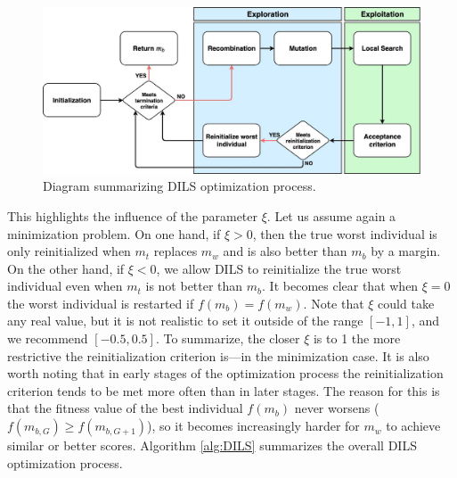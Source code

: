 \documentclass[review]{elsarticle}
\begin{document}
\begin{figure}[!h]
	\centering
	\includegraphics[scale=0.25]{Figures/DILSDiagram.jpg}
	\caption{Diagram summarizing DILS optimization process.}\label{img:DILS_diag}
\end{figure}

This highlights the influence of the parameter $\xi$. Let us assume again a minimization problem. On one hand, if $\xi > 0$, then the true worst individual is only reinitialized when $m_t$ replaces $m_w$ and is also better than $m_b$ by a margin. On the other hand, if $\xi < 0$, we allow DILS to reinitialize the true worst individual even when $m_t$ is not better than $m_b$. It becomes clear that when $\xi = 0$ the worst individual is restarted if $f(m_b) = f(m_w)$. Note that $\xi$ could take any real value, but it is not realistic to set it outside of the range $[-1,1]$, and we recommend $[-0.5, 0.5]$. To summarize, the closer $\xi$ is to 1 the more restrictive the reinitialization criterion is---in the minimization case. It is also worth noting that in early stages of the optimization process the reinitialization criterion tends to be met more often than in later stages. The reason for this is that the fitness value of the best individual $f(m_b)$ never worsens ($f(m_{b,G}) \ge f(m_{b,G+1})$), so it becomes increasingly harder for $m_w$ to achieve similar or better scores. Algorithm \ref{alg:DILS} summarizes the overall DILS optimization process.
\end{document}
